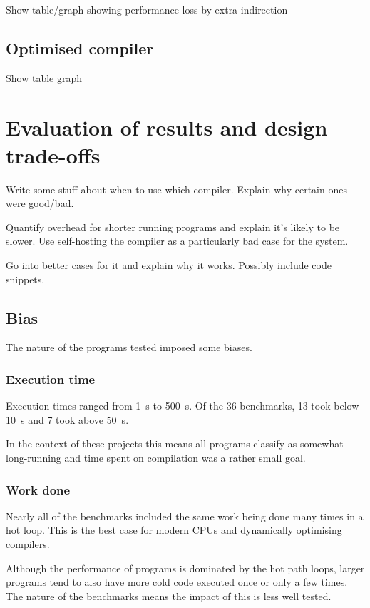 Show table/graph showing performance loss by extra indirection

\subsection{Optimised compiler}

Show table graph

\section{Evaluation of results and design trade-offs}

Write some stuff about when to use which compiler. Explain why certain ones were good/bad.

Quantify overhead for shorter running programs and explain it's likely to be slower. Use
self-hosting the compiler as a particularly bad case for the system.

Go into better cases for it and explain why it works. Possibly include code snippets.

\subsection{Bias}

The nature of the programs tested imposed some biases.

\subsubsection{Execution time}

Execution times ranged from \SI{1}{\second} to \SI{500}{\second}. Of the 36 benchmarks, 13 took
below \SI{10}{\second} and 7 took above \SI{50}{\second}.

In the context of these projects this means all programs classify as somewhat long-running and time
spent on compilation was a rather small goal.

\subsubsection{Work done}

Nearly all of the benchmarks included the same work being done many times in a hot loop. This is
the best
case for modern CPUs and dynamically optimising compilers.

Although the performance of programs is dominated by the hot path loops, larger programs tend to
also
have more cold code executed once or only a few times. The nature of the benchmarks means the
impact
of this is less well tested.

